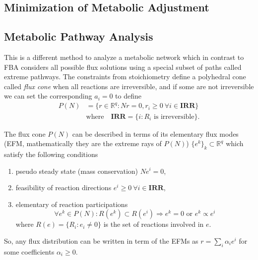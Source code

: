 \documentclass[a4paper]{article}
\theoremstyle{plain}
\theoremstyle{definition}
\theoremstyle{remark}
\begin{document}
\subsection{Minimization of Metabolic Adjustment}

\subsection{Metabolic Pathway Analysis}

This is a different method to analyze a metabolic network which in contrast to
FBA considers all possible flux solutions using a special subset of paths
called extreme pathways. The constraints from stoichiometry define a
polyhedral cone called \emph{flux cone} when all reactions are irreversible,
and if some are not irreversible we can set the corresponding $a_i = 0$ to
define
\begin{align*}
  P(N) &= \{
    r \in \mathbb{R}^q : Nr = 0, r_i \geq 0  ~ \forall i \in \textbf{IRR}
  \} \\
  &\text{where} \quad
    \textbf{IRR} = \{ i : R_i \text{ is irreversible} \}.
\end{align*}

The flux cone $P(N)$ can be described in terms of its elementary flux modes
(EFM, mathematically they are the extreme rays of $P(N)$) $\{e^k\}_k \subset
\mathbb{R}^q$ which satisfy the following conditions
\begin{enumerate}
  \item pseudo steady state (mass conservation) $Ne^i = 0$,
  \item feasibility of reaction directions $e^i \geq 0 ~ \forall i \in \mathbf{IRR}$,
  \item elementary of reaction participations
    \[
      \forall e^k \in P(N) : R(e^k) \subset R(e^i) \Rightarrow e^k = 0 \text{ or }
      e^k \propto e^i
    \]
    where $R(e) = \{R_i : e_i \neq 0\}$ is the set of reactions involved in
    $e$.
\end{enumerate}
So, any flux distribution can be written in term of the EFMs as
$r = \sum_i \alpha_i e^i$ for some coefficients $\alpha_i \geq 0$.
\end{document}

